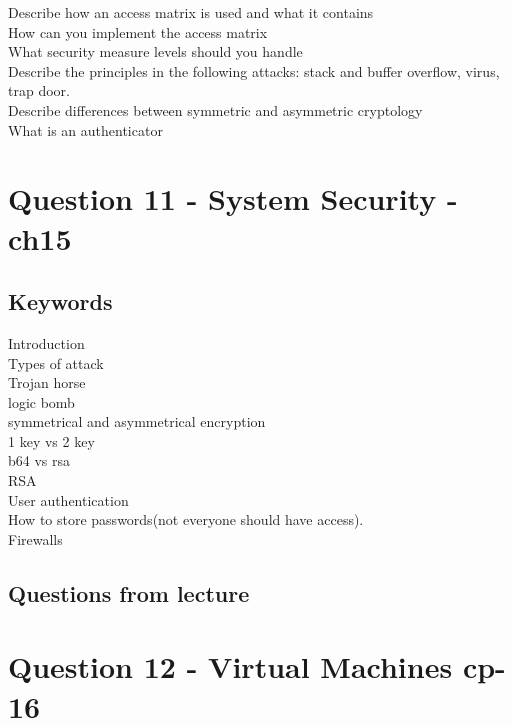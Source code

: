 \documentclass[a4paper,10pt,titlepage]{report}
\begin{document}
Describe how an access matrix is used and what it contains \\


How can you implement the access matrix \\

What security measure levels should you handle\\

Describe the principles in the following attacks: stack and buffer overflow, virus, trap door.\\

Describe differences between symmetric and asymmetric cryptology\\

What is an authenticator\\


\section{Question 11 - System Security - ch15}



\subsection{Keywords}

Introduction \\
Types of attack \\
	Trojan horse \\
	logic bomb \\

symmetrical and asymmetrical encryption \\
	1 key vs 2 key\\
	b64 vs rsa \\
	RSA \\

User authentication \\
	How to store passwords(not everyone should have access). \\
	Firewalls \\
	

\subsection{Questions from lecture}

\section{Question 12 - Virtual Machines cp-16 }
\end{document}
